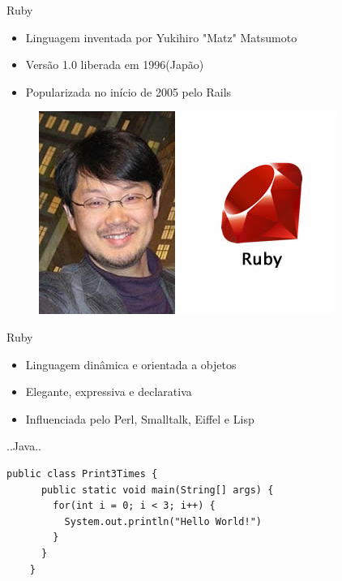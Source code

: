 \begin{frame}[fragile,t]{Ruby} 
  \begin{itemize}
    \item Linguagem inventada por Yukihiro \alert{"Matz"} Matsumoto
    \item Versão \alert{1.0} liberada em \alert{1996}(Japão)
    \item \alert{Popularizada} no início de 2005 pelo \alert{Rails}
  \end{itemize}   
  \begin{figure}[hbt]
    \includegraphics[scale=.5]{imagens/matz.jpg}
  \end{figure}
\end{frame}
\begin{frame}[fragile,t]{Ruby}
  \begin{itemize}
    \item Linguagem \alert{dinâmica} e \alert{orientada a objetos}
    \item Elegante, \alert{expressiva} e declarativa
    \item Influenciada pelo Perl, Smalltalk, Eiffel e Lisp
  \end{itemize}   
\end{frame}
\begin{frame}[fragile,t]{..Java..}
  \begin{lstlisting}[style=JavaInputStyle]
    public class Print3Times {
      public static void main(String[] args) {
        for(int i = 0; i < 3; i++) {
          System.out.println("Hello World!")
        }
      }
    }
  \end{lstlisting}
\end{frame}

